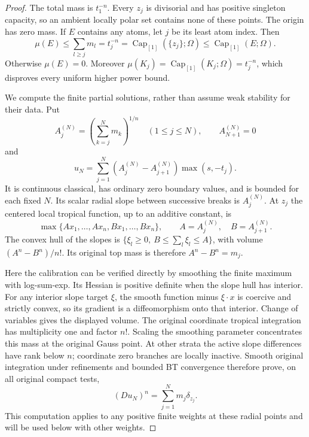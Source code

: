 \documentclass[11pt,a4paper]{article}
\numberwithin{equation}{section}
\theoremstyle{definition}
\theoremstyle{remark}
\begin{document}
\begin{proof}
The total mass is $t_1^{-n}$. Every $z_j$ is divisorial and
has positive singleton capacity, so an ambient locally polar
set contains none of these points. The origin has zero mass.
If $E$ contains any atoms, let $j$ be its least atom index.
Then
\[
 \mu(E)\leq\sum_{l\geq j}m_l=t_j^{-n}
       =\operatorname{Cap}_{[1]}(\{z_j\};\Omega)
       \leq\operatorname{Cap}_{[1]}(E;\Omega).
\]
Otherwise $\mu(E)=0$. Moreover
$\mu(K_j)=\operatorname{Cap}_{[1]}(K_j;\Omega)=t_j^{-n}$,
which disproves every uniform higher power bound.

We compute the finite partial solutions, rather than assume
weak stability for their data. Put
\[
 A_j^{(N)}=\left(\sum_{k=j}^N m_k\right)^{1/n}
 \quad(1\leq j\leq N),\qquad A_{N+1}^{(N)}=0
\]
and
\begin{equation}
 u_N=\sum_{j=1}^N
       (A_j^{(N)}-A_{j+1}^{(N)})\max(s,-t_j).
 \label{eq:r3-radial-partial-solution}
\end{equation}
It is continuous classical, has ordinary zero boundary values,
and is bounded for each fixed $N$. Its scalar radial slope
between successive breaks is $A_j^{(N)}$.
At $z_j$ the centered local tropical function, up to an additive
constant, is
\[
 \max\{A x_1,\ldots,A x_n,B x_1,\ldots,B x_n\},
 \qquad A=A_j^{(N)},\quad B=A_{j+1}^{(N)}.
\]
The convex hull of the slopes is
$\{\xi_l\geq0,\ B\leq\sum_l\xi_l\leq A\}$, with volume
$(A^n-B^n)/n!$. Its original top mass is therefore
$A^n-B^n=m_j$.

Here the calibration can be verified directly by smoothing the
finite maximum with log-sum-exp. Its Hessian is positive definite
when the slope hull has interior. For any interior slope target
$\xi$, the smooth function minus $\xi\cdot x$ is coercive and
strictly convex, so its gradient is a diffeomorphism onto that
interior. Change of variables gives the displayed volume.
The original coordinate tropical integration has multiplicity
one and factor $n!$. Scaling the smoothing parameter concentrates
this mass at the original Gauss point. At other strata the active
slope differences have rank below $n$; coordinate zero branches
are locally inactive. Smooth original integration under
refinements and bounded BT convergence therefore prove, on all
original compact tests,
\begin{equation}
 (Du_N)^n=\sum_{j=1}^N m_j\delta_{z_j}.
 \label{eq:r3-radial-partial-measure}
\end{equation}
This computation applies to any positive finite weights at these
radial points and will be used below with other weights.


\end{proof}
\end{document}
